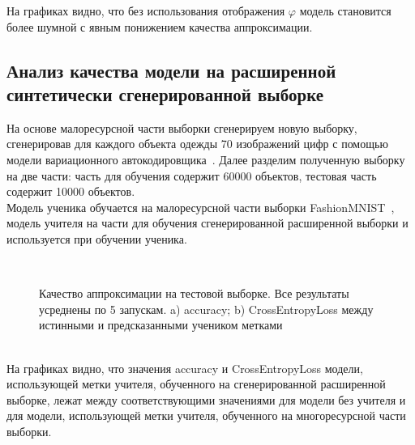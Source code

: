 На графиках видно, что без использования отображения $\varphi$ модель становится более шумной с явным понижением качества аппроксимации.

\newpage
\subsection{Анализ качества модели на расширенной синтетически сгенерированной выборке}
На основе малоресурсной части выборки сгенерируем новую выборку, сгенерировав для каждого объекта одежды 70 изображений цифр с помощью модели вариационного автокодировщика~\cite{VAE}. Далее разделим полученную выборку на две части: часть для обучения содержит 60000 объектов, тестовая часть содержит 10000 объектов.\\
Модель ученика обучается на малоресурсной части выборки FashionMNIST~\cite{FMNIST}, модель учителя на части для обучения сгенерированной расширенной выборки и используется при обучении ученика.

\begin{figure}[h!t]\center
{}
\\
\caption{Качество аппроксимации на тестовой выборке. Все результаты усреднены по 5 запускам. a) accuracy; b) CrossEntropyLoss между истинными и предсказанными учеником метками}
\end{figure}\\

На графиках видно, что значения accuracy и CrossEntropyLoss модели, использующей метки учителя, обученного на сгенерированной расширенной выборке, лежат между соответствующими значениями для модели без учителя и для модели, использующей метки учителя, обученного на многоресурсной части выборки.